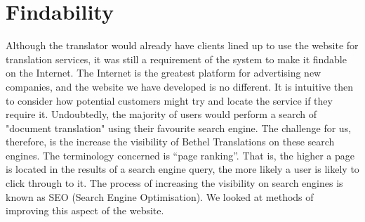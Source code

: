 \documentclass{l3proj}
\begin{document}
\section{Findability}
Although the translator would already have clients lined up to use the website for translation 
services, it was still a requirement of the system to make it findable on the Internet. The Internet
is the greatest platform for advertising new companies, and the website we have developed is no different.
It is intuitive then to consider how potential customers might try and locate the service if they require it.
Undoubtedly, the majority of users would perform a search of "document translation" using their favourite
search engine. The challenge for us, therefore, is the increase the visibility of Bethel Translations on
these search engines. The terminology concerned is ``page ranking''. That is, the higher a page is located
in the results of a search engine query, the more likely a user is likely to click through to it. \newline
The process of increasing the visibility on search engines is known as SEO (Search Engine Optimisation). We 
looked at methods of improving this aspect of the website.  
\end{document}
